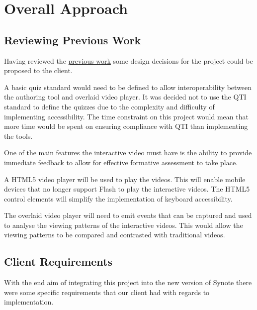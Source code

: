 \chapter{Overall Approach} 
\label{Chapter:Overall Approach}


\section{Reviewing Previous Work}
Having reviewed the \href{Chapter:Previous Work}{previous work} some design decisions for the project could be proposed to the client. 

A basic quiz standard would need to be defined to allow interoperability between the authoring tool and overlaid video player. It was decided not to use the \gls{QTI} standard to define the quizzes due to the complexity and difficulty of implementing accessibility. The time constraint on this project would mean that more time would be spent on ensuring compliance with \gls{QTI} than implementing the tools.

One of the main features the interactive video must have is the ability to provide immediate feedback to allow for effective formative assessment to take place.

A HTML5 video player will be used to play the videos. This will enable mobile devices that no longer support Flash to play the interactive videos. The HTML5 control elements will simplify the implementation of keyboard accessibility.

The overlaid video player will need to emit events that can be captured and used to analyse the viewing patterns of the interactive videos. This would allow the viewing patterns to be compared and contrasted with traditional videos.

\section{Client Requirements}
With the end aim of integrating this project into the new version of Synote there were some specific requirements that our client had with regards to implementation.

